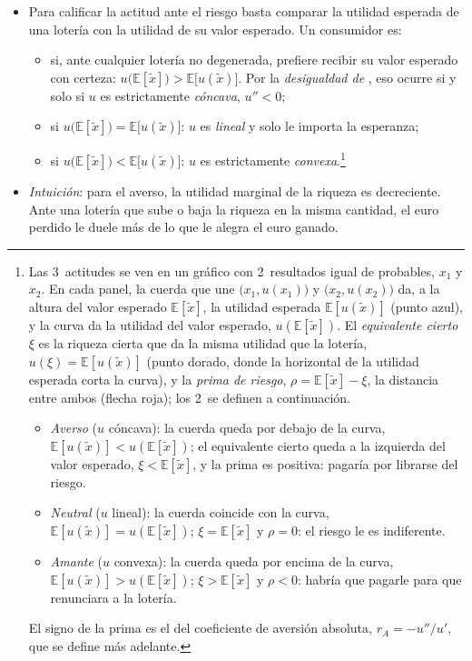 \documentclass[11pt]{article}
\begin{document}
\begin{itemize}
\item Para calificar la actitud ante el riesgo basta comparar la utilidad esperada de una lotería con la utilidad de su valor esperado. Un consumidor es:
  \begin{itemize}
  \item {} si, ante cualquier lotería no degenerada, prefiere recibir su valor esperado con certeza: $u\big(\mathbb{E}[\tilde{x}]\big)>\mathbb{E}\big[u(\tilde{x})\big]$. Por la \emph{desigualdad de }, eso ocurre si y solo si $u$ es estrictamente \emph{cóncava}, $u''<0$;
  \item {} si $u\big(\mathbb{E}[\tilde{x}]\big)=\mathbb{E}\big[u(\tilde{x})\big]$: $u$ es \emph{lineal} y solo le importa la esperanza;
  \item {} si $u\big(\mathbb{E}[\tilde{x}]\big)<\mathbb{E}\big[u(\tilde{x})\big]$: $u$ es estrictamente \emph{convexa}.\footnote{Las 3~actitudes se ven en un gráfico con 2~resultados igual de probables, $x_1$ y $x_2$. En cada panel, la cuerda que une $\big(x_1,u(x_1)\big)$ y $\big(x_2,u(x_2)\big)$ da, a la altura del valor esperado $\mathbb{E}[\tilde{x}]$, la utilidad esperada $\mathbb{E}[u(\tilde{x})]$ (punto azul), y la curva da la utilidad del valor esperado, $u(\mathbb{E}[\tilde{x}])$. El \emph{equivalente cierto} $\xi$ es la riqueza cierta que da la misma utilidad que la lotería, $u(\xi)=\mathbb{E}[u(\tilde{x})]$ (punto dorado, donde la horizontal de la utilidad esperada corta la curva), y la \emph{prima de riesgo}, $\rho=\mathbb{E}[\tilde{x}]-\xi$, la distancia entre ambos (flecha roja); los 2~se definen a continuación.
  \begin{itemize}
  \item \emph{Averso} ($u$ cóncava): la cuerda queda por debajo de la curva, $\mathbb{E}[u(\tilde{x})]<u(\mathbb{E}[\tilde{x}])$; el equivalente cierto queda a la izquierda del valor esperado, $\xi<\mathbb{E}[\tilde{x}]$, y la prima es positiva: pagaría por librarse del riesgo.
  \item \emph{Neutral} ($u$ lineal): la cuerda coincide con la curva, $\mathbb{E}[u(\tilde{x})]=u(\mathbb{E}[\tilde{x}])$; $\xi=\mathbb{E}[\tilde{x}]$ y $\rho=0$: el riesgo le es indiferente.
  \item \emph{Amante} ($u$ convexa): la cuerda queda por encima de la curva, $\mathbb{E}[u(\tilde{x})]>u(\mathbb{E}[\tilde{x}])$; $\xi>\mathbb{E}[\tilde{x}]$ y $\rho<0$: habría que pagarle para que renunciara a la lotería.
  \end{itemize}
  El signo de la prima es el del coeficiente de aversión absoluta, $r_A=-u''/u'$, que se define más adelante.}
  \end{itemize}
\item \emph{Intuición}: para el averso, la utilidad marginal de la riqueza es decreciente. Ante una lotería que sube o baja la riqueza en la misma cantidad, el euro perdido le duele más de lo que le alegra el euro ganado.
\end{itemize}
\end{document}
